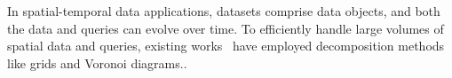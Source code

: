 In spatial-temporal data applications, datasets comprise data objects, and both the data and queries can evolve over time. To efficiently handle large volumes of spatial data and queries, existing works~\cite{Chon:2003:RKN:942343.942352} have employed decomposition methods like grids and Voronoi diagrams..



